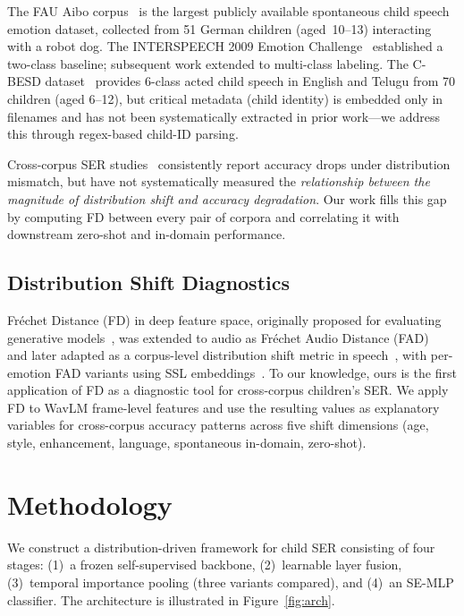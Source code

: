 \documentclass[11pt,a4paper]{article}
\begin{document}
The FAU Aibo corpus~\cite{batliner2011fau,steidl2009fau} is the largest
publicly available spontaneous child speech emotion dataset, collected from 51
German children (aged~10--13) interacting with a robot dog. The INTERSPEECH
2009 Emotion Challenge~\cite{schuller2009interspeech} established a two-class
baseline; subsequent work extended to multi-class labeling. The C-BESD
dataset~\cite{sazali2023besd,rao2024cbesd} provides 6-class acted child speech
in English and Telugu from 70 children (aged 6--12), but critical metadata (child identity)
is embedded only in filenames and has not been systematically extracted in prior
work---we address this through regex-based child-ID parsing.

Cross-corpus SER studies~\cite{schuller2010cross,latif2024cross} consistently
report accuracy drops under distribution mismatch, but have not systematically
measured the \textit{relationship between the magnitude of distribution shift
and accuracy degradation}. Our work fills this gap by computing FD between
every pair of corpora and correlating it with downstream zero-shot and
in-domain performance.

\subsection{Distribution Shift Diagnostics}

Fr\'{e}chet Distance (FD) in deep feature space, originally proposed for
evaluating generative models~\cite{heusel2017gans}, was extended to audio
as Fr\'echet Audio Distance (FAD)~\cite{kilgour2018fad} and later adapted as a
corpus-level distribution shift metric in speech~\cite{le2024dist}, with
per-emotion FAD variants using SSL embeddings~\cite{sun2024fad}. To our
knowledge, ours is the first application of FD as a diagnostic tool for
cross-corpus children's SER. We apply FD to WavLM frame-level features and use
the resulting values as explanatory variables for cross-corpus accuracy patterns
across five shift dimensions (age, style, enhancement, language, spontaneous
in-domain, zero-shot).


\section{Methodology}
\label{sec:methodology}

We construct a distribution-driven framework for child SER consisting of four
stages: (1)~a frozen self-supervised backbone, (2)~learnable layer fusion,
(3)~temporal importance pooling (three variants compared), and (4)~an SE-MLP
classifier. The architecture is illustrated in Figure~\ref{fig:arch}.
\end{document}
